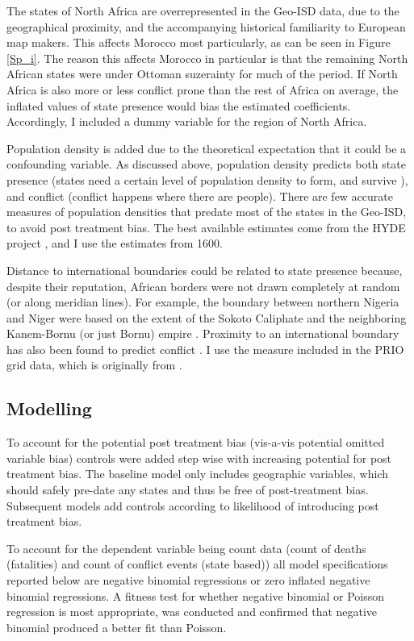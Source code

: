 \documentclass[12pt]{article}
\begin{document}
The states of North Africa are overrepresented in the Geo-ISD data, due to the
geographical proximity, and the accompanying historical familiarity to European
map makers. This affects Morocco most particularly, as can be seen in Figure
\ref{Sp_i}. The reason this affects Morocco in particular is that the remaining
North African states were under Ottoman suzerainty for much of the period. If
North Africa is also more or less conflict prone than the rest of Africa on
average, the inflated values of state presence would bias the estimated
coefficients. Accordingly, I included a dummy variable for the region of North
Africa.

Population density is added due to the theoretical expectation that it could be
a confounding variable. As discussed above, population density predicts both
state presence (states need a certain level of population density to form, and
survive \citep{scott2017against}), and conflict (conflict happens where there
are people). There are few accurate measures of population densities that
predate most of the states in the Geo-ISD, to avoid post treatment bias. The
best available estimates come from the HYDE project \citep{Goldewijk2016}, and I
use the estimates from 1600.

Distance to international boundaries could be related to state presence because,
despite their reputation, African borders were not drawn completely at random
(or along meridian lines). For example, the boundary between northern Nigeria and
Niger were based on the extent of the Sokoto Caliphate and the neighboring
Kanem-Bornu (or just Bornu) empire \citep{HiribarrenVincent2017AHoB}. Proximity
to an international boundary has also been found to predict conflict
\citep{Buhaug2002}. I use the measure included in the PRIO grid data, which is
originally from \citet{Weidmann2010a}.


\subsection{Modelling} \label{Modelling}

To account for the potential post treatment bias (vis-a-vis potential omitted
variable bias) controls were added step wise with increasing potential for post
treatment bias. The baseline model only includes geographic variables, which
should safely pre-date any states and thus be free of post-treatment bias.
Subsequent models add controls according to likelihood of introducing post
treatment bias.

To account for the dependent variable being count data (count of deaths
(fatalities) and count of conflict events (state based)) all model
specifications reported below are negative binomial regressions or zero inflated
negative binomial regressions. A fitness test for whether negative binomial or
Poisson regression is most appropriate, was conducted and confirmed that
negative binomial produced a better fit than Poisson.
\end{document}
